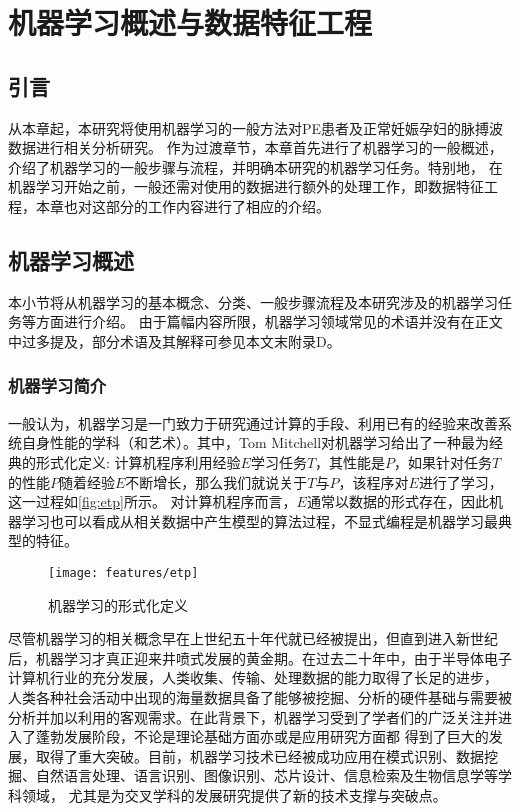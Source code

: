 \chapter{机器学习概述与数据特征工程}
\section{引言}
从本章起，本研究将使用机器学习的一般方法对PE患者及正常妊娠孕妇的脉搏波数据进行相关分析研究。
作为过渡章节，本章首先进行了机器学习的一般概述，介绍了机器学习的一般步骤与流程，并明确本研究的机器学习任务。特别地，
在机器学习开始之前，一般还需对使用的数据进行额外的处理工作，即数据特征工程，本章也对这部分的工作内容进行了相应的介绍。

\section{机器学习概述}
本小节将从机器学习的基本概念、分类、一般步骤流程及本研究涉及的机器学习任务等方面进行介绍。
由于篇幅内容所限，机器学习领域常见的术语并没有在正文中过多提及，部分术语及其解释可参见本文末附录D。
\subsection{机器学习简介}
一般认为，机器学习是一门致力于研究通过计算的手段、利用已有的经验来改善系统自身性能的学科（和艺术）\cite{Zhou2016,Aurélien2018}。其中，Tom Mitchell对机器学习给出了一种最为经典的形式化定义:
计算机程序利用经验$E$学习任务$T$，其性能是$P$，如果针对任务$T$的性能$P$随着经验$E$不断增长，那么我们就说关于$T$与$P$，该程序对$E$进行了学习，这一过程如\autoref{fig:etp}所示\cite{mitchell1997,Zhou2016}。
对计算机程序而言，$E$通常以数据的形式存在，因此机器学习也可以看成从相关数据中产生模型的算法过程，不显式编程是机器学习最典型的特征。
\begin{figure}[htbp]
  \centering
  \texttt{[image: features/etp]}
  \caption[机器学习方法的形式化定义]{\label{fig:etp}机器学习的形式化定义}
\end{figure}

尽管机器学习的相关概念早在上世纪五十年代就已经被提出，但直到进入新世纪后，机器学习才真正迎来井喷式发展的黄金期。在过去二十年中，由于半导体电子计算机行业的充分发展，人类收集、传输、处理数据的能力取得了长足的进步，
人类各种社会活动中出现的海量数据具备了能够被挖掘、分析的硬件基础与需要被分析并加以利用的客观需求。在此背景下，机器学习受到了学者们的广泛关注并进入了蓬勃发展阶段，不论是理论基础方面亦或是应用研究方面都
得到了巨大的发展，取得了重大突破。目前，机器学习技术已经被成功应用在模式识别、数据挖掘、自然语言处理、语言识别、图像识别、芯片设计、信息检索及生物信息学等学科领域，
尤其是为交叉学科的发展研究提供了新的技术支撑与突破点\cite{Zhou2016,Aurélien2018,Li2017}。

